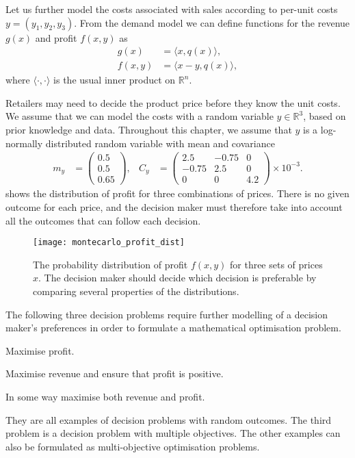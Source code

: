 \documentclass[main.tex]{subfiles}
\begin{document}
Let us further model the costs associated with sales according to per-unit
costs $y=(y_1,y_2,y_3)$.
From the demand model we can define functions for the revenue $g(x)$ and profit
$f(x,y)$ as
\begin{align}
  g(x)&=\langle x,q(x) \rangle,\\
  f(x,y)
      &=\langle x-y,q(x) \rangle,
\end{align}
where $\langle \cdot,\cdot \rangle$ is the usual inner product on
$\mathbb{R}^n$.

Retailers may need to decide the product price before they know the
unit costs. We assume that we can model the costs with a random
variable $y\in\mathbb{R}^3$, based on prior knowledge and data.
Throughout this chapter, we  assume that $y$ is a log-normally
distributed random variable with mean and covariance
\begin{align}
  m_y
  &= \begin{pmatrix}0.5\\0.5\\0.65
  \end{pmatrix},
  &C_y
  &=\begin{pmatrix}
    2.5&-0.75&0\\
    -0.75&2.5&0\\
    0&0&4.2
  \end{pmatrix}
         \times 10^{-3}.
\end{align}
 shows the distribution of
profit for three combinations of prices. There is no given outcome
for each price, and the decision maker must therefore take into
account all the outcomes that can follow each decision.
\begin{figure}[htb]
  \centering
  \texttt{[image: montecarlo\_profit\_dist]}
  \caption[Probability distribution of profit]{The probability distribution of profit $f(x,y)$ for three
    sets of prices $x$.
    The decision maker should decide which decision is preferable by comparing
    several properties of the distributions.
  }\label{fig:example_profit_distributions}
\end{figure}

The following three decision problems require further modelling of a
decision maker's preferences in order to formulate a mathematical
optimisation problem.
\begin{enumerate}
  \begin{samepage}
  \item Maximise profit.
  \item Maximise revenue and ensure that profit is positive.
  \item In some way maximise both revenue and profit.
  \end{samepage}
\end{enumerate}
They are all examples of decision problems with random outcomes.
The third problem is a decision problem with
multiple objectives. The other examples can also be
formulated as multi-objective optimisation problems.
\end{document}
